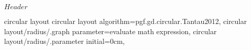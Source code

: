 %
%
%

\ProvidesFileRCS[v\pgfversion] $Header$



%
%
\pgfgddeclarealgorithmkey
  {circular layout}
  {circular layout}
  {
    algorithm=pgf.gd.circular.Tantau2012,
    circular layout/radius/.graph parameter=evaluate math expression,
    circular layout/radius/.parameter initial=0cm,
  }



\endinput